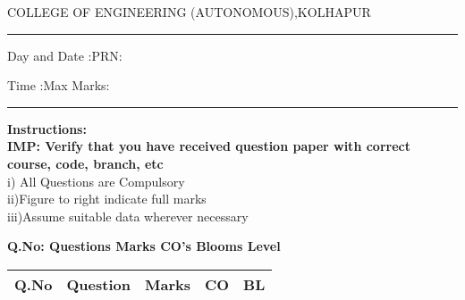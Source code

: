 \documentclass[12pt]{article}
\begin{document}
	
\par
COLLEGE OF ENGINEERING (AUTONOMOUS),KOLHAPUR
\par\noindent\rule{\textwidth}{0.4pt}
\par
{}\par
{}\par
\begin{flushleft}
Day and Date :{}\hspace{3.5cm}PRN:
\end{flushleft}

\begin{flushleft}
Time :{}\hspace{3cm}Max Marks:{}\\
\end{flushleft}
\noindent\rule{\textwidth}{0.1pt}
\begin{flushleft}
{\bf Instructions:}\\
{\hspace{0.5cm} \bf IMP: Verify that you have received question paper with correct course, code, branch, etc}\\
\hspace{1cm}i) All Questions are Compulsory\\
\hspace{1cm}ii)Figure to right indicate full marks\\
\hspace{1cm}iii)Assume suitable data wherever necessary\\
\end{flushleft} 

\begin{flushleft}
{\bf Q.No: \hspace{2.5cm} \bf Questions \hspace{0.25cm} \bf Marks \hspace{0.25cm} \bf CO's\hspace{0.25cm} \bf Blooms Level}	
\end{flushleft}


	\begin{center}
		\begin{tabular}{l c l l l}
				\hline
			\textbf{Q.No} & \textbf{Question} &\textbf{Marks}  &\textbf{CO} &\textbf{BL}\\
			\hline
			
						\end{tabular}
		\end{center}
	
\end{document}
